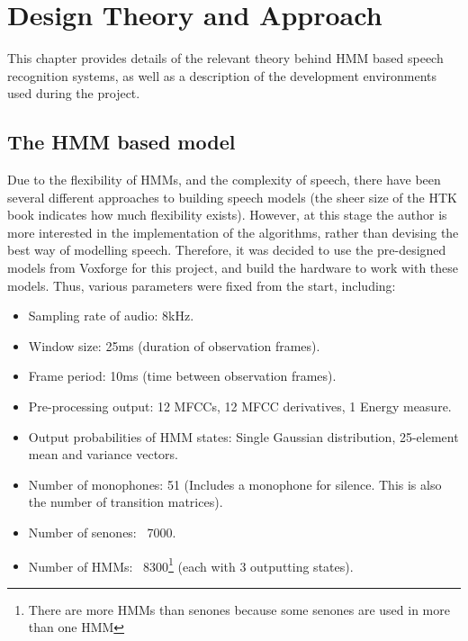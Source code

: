 \chapter{Design Theory and Approach} %
\label{cha:design_approach}



This chapter provides details of the relevant theory behind HMM based speech recognition systems, as well as a description of the development environments used during the project.

\section{The HMM based model} %
\label{sec:the_hmm_based_model}
	Due to the flexibility of HMMs, and the complexity of speech, there have been several different approaches to building speech models (the sheer size of the HTK book indicates how much flexibility exists).  However, at this stage the author is more interested in the implementation of the algorithms, rather than devising the best way of modelling speech.  Therefore, it was decided to use the pre-designed models from Voxforge for this project, and build the hardware to work with these models.  Thus, various parameters were fixed from the start, including:

	\begin{itemize}
		\item Sampling rate of audio: 8kHz. %
		\item Window size: 25ms (duration of observation frames).
		\item Frame period: 10ms (time between observation frames).
		\item Pre-processing output: 12 MFCCs, 12 MFCC derivatives, 1 Energy measure.
		\item Output probabilities of HMM states: Single Gaussian distribution, 25-element mean and variance vectors.
		\item Number of monophones: 51 (Includes a monophone for silence.  This is also the number of transition matrices).
		\item Number of senones: ~7000.
		\item Number of HMMs: ~8300\footnote{There are more HMMs than senones because some senones are used in more than one HMM} (each with 3 outputting states).
	\end{itemize}


